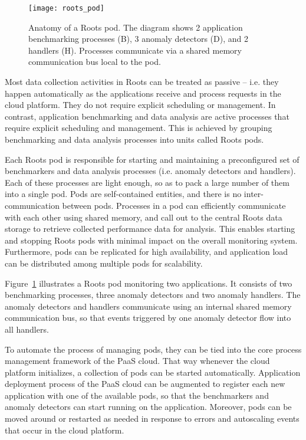 \begin{figure}
\centering
\texttt{[image: roots\_pod]}
\caption{Anatomy of a Roots pod. The diagram shows 2 application benchmarking processes (B), 
3 anomaly detectors (D), and 2 handlers (H). Processes communicate via a shared
memory communication bus local to the pod.}
\label{fig:roots_pod}
\end{figure}
Most data collection activities in Roots can be treated as passive -- i.e. they
happen automatically as the applications receive and process requests in the cloud
platform. They do not require explicit scheduling or management. In contrast,
application benchmarking and data analysis are active processes that require
explicit scheduling and management.  This is achieved by grouping benchmarking
and data analysis processes into units called Roots pods. 

Each Roots pod is responsible for starting and maintaining a preconfigured set of
benchmarkers and data analysis processes (i.e. anomaly detectors and handlers). 
Each of these processes are light enough, so as to pack a large number of them
into a single pod. Pods are self-contained entities, and there is no inter-communication
between pods. Processes in a pod can efficiently communicate with each other 
using shared memory, and call out to the central Roots data storage to retrieve 
collected performance data for analysis. This enables starting and stopping 
Roots pods with minimal impact on the overall monitoring system. Furthermore, pods
can be replicated for high availability, and application load can be distributed
among multiple pods for scalability.

Figure~\ref{fig:roots_pod} illustrates a Roots pod monitoring two applications.
It consists of two benchmarking processes, three anomaly detectors and 
two anomaly handlers. The anomaly detectors and handlers communicate
using an internal shared memory communication bus, so that events triggered by one anomaly
detector flow into all handlers. 

To automate the process of managing pods, they can be tied into the core
process management framework of the PaaS cloud. That way whenever the cloud
platform initializes, a collection of pods can be started automatically.
Application deployment process of the PaaS cloud can be augmented
to register each new application with one of the available pods, so that the
benchmarkers and anomaly detectors can start running on the application.
Moreover, pods can be moved around or restarted as needed in response
to errors and autoscaling events that occur in the cloud platform.
